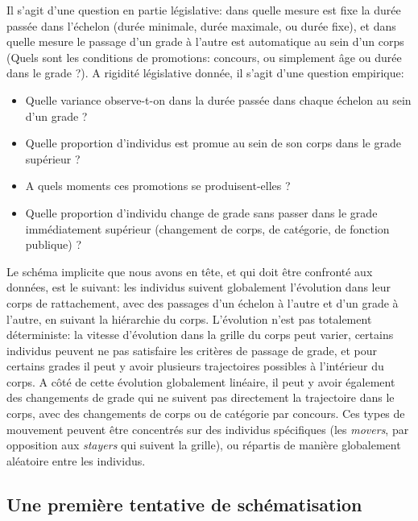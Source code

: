 \documentclass[11pt,a4paper]{article}
\begin{document}
Il s'agit d'une question en partie législative: dans quelle mesure est fixe la durée passée dans l'échelon (durée minimale, durée maximale, ou durée fixe), et dans quelle mesure le passage d'un grade à l'autre est automatique au sein d'un corps (Quels sont les conditions de promotions: concours, ou simplement âge ou durée dans le grade ?). A rigidité législative donnée, il s'agit d'une question empirique:
\begin{itemize}
    \item Quelle variance observe-t-on dans la durée passée dans chaque échelon au sein d'un grade ? 
    \item Quelle proportion d'individus est promue au sein de son corps dans le grade supérieur ?
   \item A quels moments ces promotions se produisent-elles ? 
   \item Quelle proportion d'individu change de grade sans passer dans le grade immédiatement supérieur (changement de corps, de catégorie, de fonction publique) ?
\end{itemize}  

Le schéma implicite que nous avons en tête, et qui doit être confronté aux données, est le suivant: les individus suivent globalement l'évolution dans leur corps de rattachement, avec des passages d'un échelon à l'autre et d'un grade à l'autre, en suivant la hiérarchie du corps. L'évolution n'est pas totalement déterministe: la vitesse d'évolution dans la grille du corps peut varier, certains individus peuvent ne pas satisfaire les critères de passage de grade, et pour certains grades il peut y avoir plusieurs trajectoires possibles à l'intérieur du corps. A côté de cette évolution globalement linéaire, il peut y avoir également des changements de grade qui ne suivent pas directement la trajectoire dans le corps, avec des changements de corps ou de catégorie par concours. Ces types de mouvement peuvent être concentrés sur des individus spécifiques (les \textit{movers}, par opposition aux \textit{stayers} qui suivent la grille), ou répartis de manière globalement aléatoire entre les individus. 

\subsection*{Une première tentative de schématisation}
\end{document}
